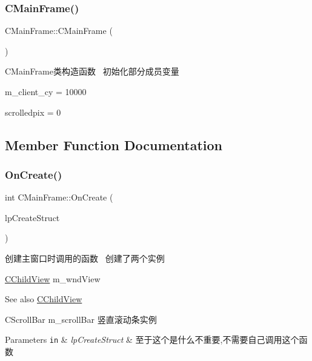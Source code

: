 \subsubsection{\texorpdfstring{C\+Main\+Frame()}{CMainFrame()}}
{\footnotesize\ttfamily C\+Main\+Frame\+::\+C\+Main\+Frame (\begin{DoxyParamCaption}{ }\end{DoxyParamCaption})}



C\+Main\+Frame类构造函数~\newline
初始化部分成员变量 


\begin{DoxyItemize}
\item m\+\_\+client\+\_\+cy = 10000
\item scrolledpix = 0 
\end{DoxyItemize}

\subsection{Member Function Documentation}
\mbox{\label{class_c_main_frame_a48666466fd37412fcaeff75c3b12e0ed}} 
\subsubsection{\texorpdfstring{On\+Create()}{OnCreate()}}
{\footnotesize\ttfamily int C\+Main\+Frame\+::\+On\+Create (\begin{DoxyParamCaption}\item[{L\+P\+C\+R\+E\+A\+T\+E\+S\+T\+R\+U\+CT}]{lp\+Create\+Struct }\end{DoxyParamCaption})\hspace{0.3cm}{\ttfamily [protected]}}



创建主窗口时调用的函数~\newline
创建了两个实例~\newline



\begin{DoxyItemize}
\item \hyperlink{class_c_child_view}{C\+Child\+View} m\+\_\+wnd\+View \begin{DoxySeeAlso}{See also}
\hyperlink{class_c_child_view}{C\+Child\+View}
\end{DoxySeeAlso}

\item C\+Scroll\+Bar m\+\_\+scroll\+Bar 竖直滚动条实例 
\begin{DoxyParams}[1]{Parameters}
\mbox{\tt in}  & {\em lp\+Create\+Struct} & 至于这个是什么不重要,不需要自己调用这个函数 \\
\hline
\end{DoxyParams}

\end{DoxyItemize}\mbox{\label{class_c_main_frame_adf171bf1f2c6f10cc85dbe8db3fc93f7}} 
